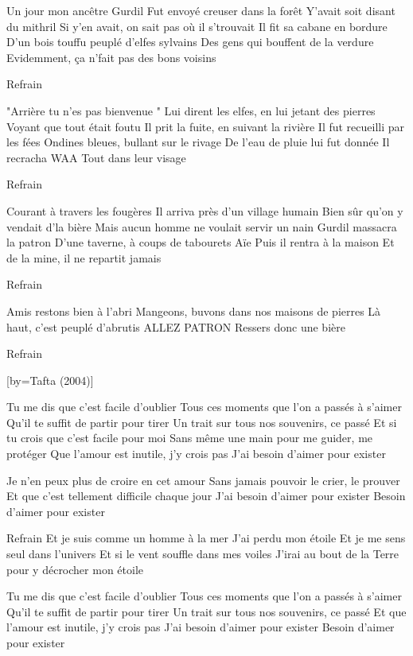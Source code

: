 \beginverse
Un jour mon ancêtre Gurdil
Fut envoyé creuser dans la forêt
Y'avait soit disant du mithril
Si y'en avait, on sait pas où il s'trouvait \!
Il fit sa cabane en bordure
D'un bois touffu peuplé d'elfes sylvains
Des gens qui bouffent de la verdure
Evidemment, ça n'fait pas des bons voisins \!
\endverse

\beginverse
Refrain
\endverse

"Arrière tu n'es pas bienvenue \!"
Lui dirent les elfes, en lui jetant des pierres
Voyant que tout était foutu
Il prit la fuite, en suivant la rivière
Il fut recueilli par les fées
Ondines bleues, bullant sur le rivage
De l'eau de pluie lui fut donnée
Il recracha WAA \! Tout dans leur visage \!

\beginverse
Refrain
\endverse

\beginverse
Courant à travers les fougères
Il arriva près d'un village humain
Bien sûr qu'on y vendait d'la bière
Mais aucun homme ne voulait servir un nain \!
Gurdil massacra la patron
D'une taverne, à coups de tabourets \! Aïe \!
Puis il rentra à la maison
Et de la mine, il ne repartit jamais \!
\endverse

\beginverse
Refrain
\endverse

\beginverse
Amis restons bien à l'abri
Mangeons, buvons dans nos maisons de pierres
Là haut, c'est peuplé d'abrutis
ALLEZ PATRON \! Ressers donc une bière \!
\endverse

\beginverse
Refrain
\endverse

[by={Tafta (2004)}]

\beginverse
Tu me dis que c'est facile d'oublier
Tous ces moments que l'on a passés à s'aimer
Qu'il te suffit de partir pour tirer
Un trait sur tous nos souvenirs, ce passé
Et si tu crois que c'est facile pour moi
Sans même une main pour me guider, me protéger
Que l'amour est inutile, j'y crois pas
J'ai besoin d'aimer pour exister
\endverse

\beginverse
Je n'en peux plus de croire en cet amour
Sans jamais pouvoir le crier, le prouver
Et que c'est tellement difficile chaque jour
J'ai besoin d'aimer pour exister
Besoin d'aimer pour exister
\endverse

\beginverse
Refrain
Et je suis comme un homme à la mer
J'ai perdu mon étoile
Et je me sens seul dans l'univers
Et si le vent souffle dans mes voiles
J'irai au bout de la Terre pour y décrocher mon étoile \\[bis]
\endverse

\beginverse
Tu me dis que c'est facile d'oublier
Tous ces moments que l'on a passés à s'aimer
Qu'il te suffit de partir pour tirer
Un trait sur tous nos souvenirs, ce passé
Et que l'amour est inutile, j'y crois pas
J'ai besoin d'aimer pour exister
Besoin d'aimer pour exister
\endverse


